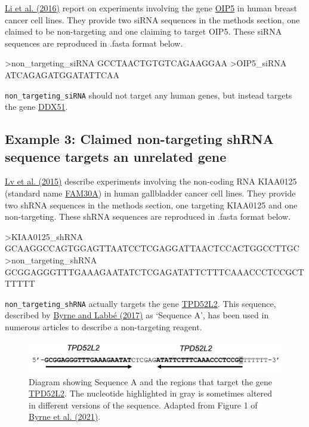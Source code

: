 \documentclass[letterpaper, 12pt]{article}
\begin{document}
\href{https://doi.org/10.1016/j.gene.2016.11.046}{Li et al. (2016)} report on experiments involving the gene \href{https://www.ncbi.nlm.nih.gov/gene/11339}{OIP5} in human breast cancer cell lines. They provide two siRNA sequences in the methods section, one claimed to be non-targeting and one claiming to target OIP5. These siRNA sequences are reproduced in .fasta format below.

\begin{verbatim*}
>non_targeting_siRNA
GCCTAACTGTGTCAGAAGGAA
>OIP5_siRNA
ATCAGAGATGGATATTCAA
\end{verbatim*}

\verb|non_targeting_siRNA| should not target any human genes, but instead targets the gene \href{https://www.ncbi.nlm.nih.gov/gene/317781}{DDX51}.

\pagebreak

\subsection*{Example 3: Claimed non-targeting shRNA sequence targets an unrelated gene}

\href{https://doi.org/10.1155/2015/108458}{Lv et al. (2015)} describe experiments involving the non-coding RNA KIAA0125 (standard name \href{https://www.ncbi.nlm.nih.gov/gene/9834}{FAM30A}) in human gallbladder cancer cell lines. They provide two shRNA sequences in the methods section, one targeting KIAA0125 and one non-targeting. These shRNA sequences are reproduced in .fasta format below.

\begin{verbatim*}
>KIAA0125_shRNA
GCAAGGCCAGTGGAGTTAATCCTCGAGGATTAACTCCACTGGCCTTGC
>non_targeting_shRNA
GCGGAGGGTTTGAAAGAATATCTCGAGATATTCTTTCAAACCCTCCGCTTTTTT
\end{verbatim*}

\verb|non_targeting_shRNA| actually targets the gene \href{https://www.ncbi.nlm.nih.gov/gene/7165}{TPD52L2}. This sequence, described by \href{https://doi.org/10.1007/s11192-016-2209-6}{Byrne and Labb\'e (2017)} as `Sequence A', has been used in numerous articles to describe a non-targeting reagent.

\begin{figure}[h!tbp]
    \centering
    \includegraphics[width=\textwidth]{img/nucleotide_sequences/Screenshot 2025-04-03 at 13-21-09 11192_2021_3871_Fig1_HTML.png}
    \caption*{Diagram showing Sequence A and the regions that target the gene \href{https://www.ncbi.nlm.nih.gov/gene/7165}{TPD52L2}. The nucleotide highlighted in gray is sometimes altered in different versions of the sequence. Adapted from Figure 1 of \href{https://doi.org/10.1007/s11192-021-03871-9}{Byrne et al. (2021)}.}
\end{figure}
\end{document}
